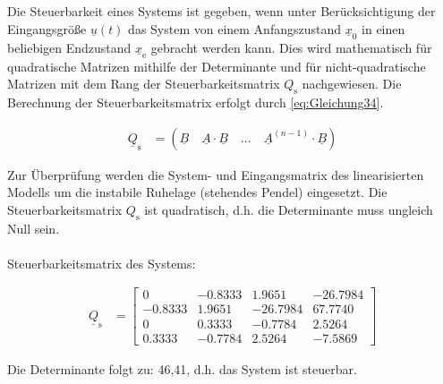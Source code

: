 Die Steuerbarkeit eines Systems ist gegeben, wenn unter Berücksichtigung der Eingangsgröße $\underline{u}(t)$ das System von einem Anfangszustand $\underline{x}_{\mathrm{0}}$ in einen beliebigen Endzustand $\underline{x}_{\mathrm{e}}$ gebracht werden kann. Dies wird mathematisch für quadratische Matrizen mithilfe der Determinante und für nicht-quadratische Matrizen mit dem Rang der Steuerbarkeitsmatrix $Q_{\mathrm{s}}$ nachgewiesen. Die Berechnung der Steuerbarkeitsmatrix erfolgt durch \autoref{eq:Gleichung34}.

\begin{align}\label{eq:Gleichung34}
    \underline{Q}_{\mathrm{s}} &= \left(\underline{B} \quad \underline{A}\cdot\underline{B} \quad ... \quad \underline{A}^{(n-1)}\cdot\underline{B}\right)
\end{align}

Zur Überprüfung werden die System- und Eingangsmatrix des linearisierten Modells um die instabile Ruhelage (stehendes Pendel) eingesetzt. Die Steuerbarkeitsmatrix $Q_{\mathrm{s}}$ ist quadratisch, d.h. die Determinante muss ungleich Null sein.\\\\
Steuerbarkeitsmatrix des Systems:

\begin{align}\label{eq:Gleichung35}
    \underline{Q}_{\mathrm{s}} &=
    \begin{bmatrix}
        0 & -0.8333 & 1.9651 & -26.7984 \\
        -0.8333 & 1.9651 & -26.7984 & 67.7740 \\
        0 & 0.3333 & -0.7784 & 2.5264 \\
        0.3333 & -0.7784 & 2.5264 & -7.5869
    \end{bmatrix}
\end{align}

Die Determinante folgt zu: 46,41, d.h. das System ist steuerbar.